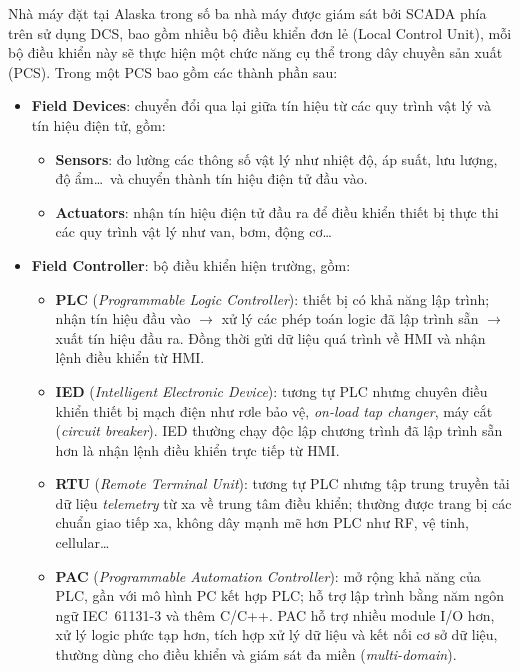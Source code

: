 \documentclass[../main.tex]{subfiles}
\begin{document}
\begin{itemize}
    Nhà máy đặt tại Alaska trong số ba nhà máy được giám sát bởi SCADA phía trên sử dụng DCS, bao gồm nhiều bộ điều khiển đơn 
    lẻ (Local Control Unit), mỗi bộ điều khiển này sẽ thực hiện một chức năng cụ thể trong dây chuyền sản xuất (PCS). Trong một PCS bao gồm các thành phần sau:

    \begin{itemize}
        \item \textbf{Field Devices}: chuyển đổi qua lại giữa tín hiệu từ các quy trình vật lý và tín hiệu điện tử, gồm:
        \begin{itemize}
            \item \textbf{Sensors}: đo lường các thông số vật lý như nhiệt độ, áp suất, lưu lượng, độ ẩm\ldots\ và chuyển thành tín hiệu điện tử đầu vào.
            \item \textbf{Actuators}: nhận tín hiệu điện tử đầu ra để điều khiển thiết bị thực thi các quy trình vật lý như van, bơm, động cơ\ldots
        \end{itemize}

        \item \textbf{Field Controller}: bộ điều khiển hiện trường, gồm:
        \begin{itemize}
            \item \textbf{PLC} (\textit{Programmable Logic Controller}): thiết bị có khả năng lập trình; nhận tín hiệu đầu vào $\rightarrow$ xử lý các phép toán logic đã lập trình sẵn $\rightarrow$ xuất tín hiệu đầu ra. Đồng thời gửi dữ liệu quá trình về HMI và nhận lệnh điều khiển từ HMI.

            \item \textbf{IED} (\textit{Intelligent Electronic Device}): tương tự PLC nhưng chuyên điều khiển thiết bị mạch điện như rơle bảo vệ, \textit{on-load tap changer}, máy cắt (\textit{circuit breaker}). IED thường chạy độc lập chương trình đã lập trình sẵn hơn là nhận lệnh điều khiển trực tiếp từ HMI.

            \item \textbf{RTU} (\textit{Remote Terminal Unit}): tương tự PLC nhưng tập trung truyền tải dữ liệu \textit{telemetry} từ xa về trung tâm điều khiển; thường được trang bị các chuẩn giao tiếp xa, không dây mạnh mẽ hơn PLC như RF, vệ tinh, cellular\ldots

            \item \textbf{PAC} (\textit{Programmable Automation Controller}): mở rộng khả năng của PLC, gần với mô hình PC kết hợp PLC; hỗ trợ lập trình bằng năm ngôn ngữ IEC~61131-3 và thêm C/C++. PAC hỗ trợ nhiều module I/O hơn, xử lý logic phức tạp hơn, tích hợp xử lý dữ liệu và kết nối cơ sở dữ liệu, thường dùng cho điều khiển và giám sát đa miền (\textit{multi-domain}).
        \end{itemize}


\end{itemize}
\end{itemize}
\end{document}
